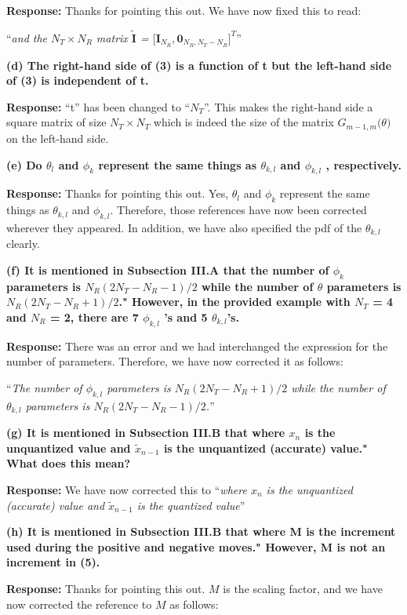 \documentclass[12pt]{letter}
\begin{document}
\textbf{Response:} Thanks for pointing this out.  We have now fixed
this to read:

``\emph{and the $N_T \times N_R$ matrix
  $\tilde{\textbf{I}}$ =
  $\big[\textbf{I}_{N_R }, {\boldsymbol{0}}_{N_R ,N_T
    -N_R}\big]^{T}$}''

\textbf{(d) The right-hand side of (3) is a function of t but the left-hand side of (3) is independent of t.}

\textbf{Response:} ``t'' has been changed to ``$N_T$''. This makes the
right-hand side a square matrix of size $N_T \times N_T$ which is
indeed the size of the matrix $G_{m-1,m}\big(\theta\big)$ on the
left-hand side.

\textbf{(e) Do $\theta_l$ and $\phi_k$ represent the same things as $\theta_{k,l}$ and $\phi_{k,l}$ , respectively.}

\textbf{Response:} Thanks for pointing this out. Yes, $\theta_l$ and
$\phi_k$ represent the same things as $\theta_{k,l}$ and
$\phi_{k,l}$. Therefore, those references have now been corrected
wherever they appeared. In addition, we have also specified the pdf of
the $\theta_{k,l}$ clearly.

\textbf{(f) It is mentioned in Subsection III.A that the number of
  $\phi_k$ parameters is $N_R(2N_T - N_R -1 )/2$ while the number of
  $\theta$ parameters is $N_R(2N_T -N_R + 1)/2$." However, in the
  provided example with $N_T$ = 4 and $N_R$ = 2, there are 7
  $\phi_{k,l}$ 's and 5 $\theta_{k,l}$'s.}

\textbf{Response:} There was an error and we had interchanged the
expression for the number of parameters. Therefore, we have now
corrected it as follows:

``\emph{The number of $\phi_{k,l}$ parameters is
  $N_{R}(2N_{T} - N_{R}+1)/2$ while the number of $\theta_{k,l}$
  parameters is $N_{R}(2N_{T} - N_{R}-1)/2$.}''

\textbf{(g) It is mentioned in Subsection III.B that where $x_n$ is the unquantized value and $\tilde{x}_{n-1}$ is the unquantized (accurate) value." What does this mean?}

\textbf{Response:} We have now corrected this to ``\emph{where $x_n$ is
  the unquantized (accurate) value and $\tilde{x}_{n-1}$ is the
  quantized value}''

\textbf{(h) It is mentioned in Subsection III.B that where M is the increment used during the positive and negative moves." However, M is not an increment in (5).}

\textbf{Response:} Thanks for pointing this out. $M$ is the scaling
factor, and we have now corrected the reference to $M$ as follows:
\end{document}
